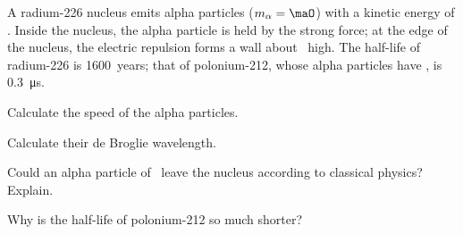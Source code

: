 A radium-226 nucleus emits alpha particles ($m_\alpha = \maO$) with a kinetic energy of \EaO. Inside the nucleus, the alpha particle is held by the strong force; at the edge of the nucleus, the electric repulsion forms a wall about \EbO\ high. The half-life of radium-226 is 1600~years; that of polonium-212, whose alpha particles have \EpO, is \SI{0.3}{\micro\s}.

\begin{abcliste}
\abc Calculate the speed of the alpha particles.

\abc Calculate their de Broglie wavelength.

\abc Could an alpha particle of \EaO\ leave the nucleus according to classical physics? Explain.

\abc Why is the half-life of polonium-212 so much shorter?
\end{abcliste}
